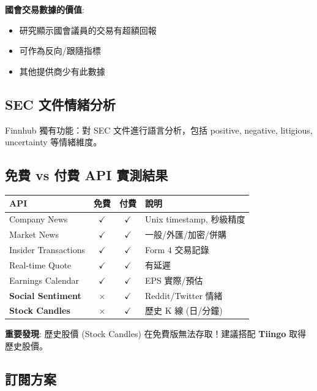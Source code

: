 \documentclass[11pt,a4paper]{article}
\newcommand{\cmark}{\textcolor{successgreen}{$\checkmark$}}
\newcommand{\xmark}{\textcolor{dangered}{$\times$}}
\begin{document}
\textbf{國會交易數據的價值}:
\begin{itemize}
    \item 研究顯示國會議員的交易有超額回報
    \item 可作為反向/跟隨指標
    \item 其他提供商少有此數據
\end{itemize}

\subsection{SEC 文件情緒分析}

Finnhub 獨有功能：對 SEC 文件進行語言分析，包括 positive, negative, litigious, uncertainty 等情緒維度。

\subsection{免費 vs 付費 API 實測結果}

\begin{table}[H]
\centering
\begin{tabular}{@{}lccp{6cm}@{}}
\toprule
\textbf{API} & \textbf{免費} & \textbf{付費} & \textbf{說明} \\
\midrule
Company News & \cmark & \cmark & Unix timestamp, 秒級精度 \\
Market News & \cmark & \cmark & 一般/外匯/加密/併購 \\
Insider Transactions & \cmark & \cmark & Form 4 交易記錄 \\
Real-time Quote & \cmark & \cmark & 有延遲 \\
Earnings Calendar & \cmark & \cmark & EPS 實際/預估 \\
\textbf{Social Sentiment} & \xmark & \cmark & Reddit/Twitter 情緒 \\
\textbf{Stock Candles} & \xmark & \cmark & 歷史 K 線 (日/分鐘) \\
\bottomrule
\end{tabular}
\end{table}

\begin{tcolorbox}[colback=warningyellow!10,colframe=warningyellow]
\textbf{重要發現}: 歷史股價 (Stock Candles) 在免費版無法存取！建議搭配 \textbf{Tiingo} 取得歷史股價。
\end{tcolorbox}

\subsection{訂閱方案}
\end{document}
